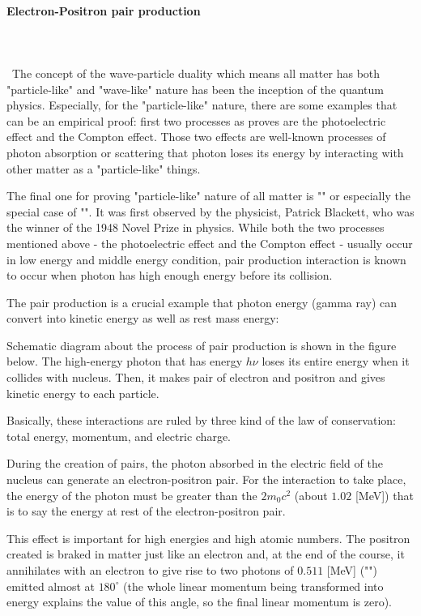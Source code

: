 	\paragraph{Electron-Positron pair production}\mbox{}\\\\\
	The concept of the wave-particle duality which means all matter has both "particle-like" and "wave-like" nature has been the inception of the quantum physics. Especially, for the "particle-like" nature, there are some examples that can be an empirical proof: first two processes as proves are the photoelectric effect and the Compton effect. Those two effects are well-known processes of photon absorption or scattering that photon loses its energy by interacting with other matter as a "particle-like" things.
	
	The final one for proving "particle-like" nature of all matter is "" or especially the special case of "". It was first observed by the physicist, Patrick Blackett, who was the winner of the 1948 Novel Prize in physics. While both the two processes mentioned above - the photoelectric effect and the Compton effect - usually occur in low energy and middle energy condition, pair production interaction is known to occur when photon has high enough energy before its collision.
	
	The pair production is a crucial example that photon energy (gamma ray) can convert into kinetic energy as well as rest mass energy:
	
	Schematic diagram about the process of pair production is shown in the figure below. The high-energy photon that has energy $h\nu$ loses its entire energy when it collides with nucleus. Then, it makes pair of electron and positron and gives kinetic energy to each particle.
	
	Basically, these interactions are ruled by three kind of the law of conservation: total energy, momentum, and electric charge.
	
	During the creation of pairs, the photon absorbed in the electric field of the nucleus can generate an electron-positron pair. For the interaction to take place, the energy of the photon must be greater than the $2m_0c^2$ (about $1.02$ [MeV]) that is to say the energy at rest of the electron-positron pair.

	This effect is important for high energies and high atomic numbers. The positron created is braked in matter just like an electron and, at the end of the course, it annihilates with an electron to give rise to two photons of $0.511$ [MeV] ("") emitted almost at $180^\circ$ (the whole linear momentum being transformed into energy explains the value of this angle, so the final linear momentum is zero).
	
